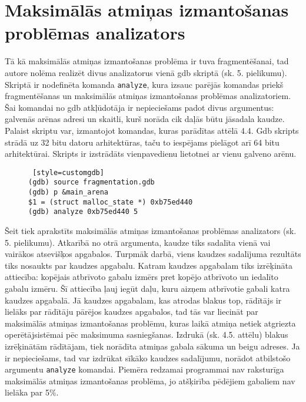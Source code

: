 \section{Maksimālās atmiņas izmantošanas problēmas analizators}
Tā kā maksimālās atmiņas izmantošanas problēma ir tuva fragmentēšanai, tad autore nolēma realizēt divus analizatorus vienā gdb skriptā (sk. 5. pielikumu).
Skriptā ir nodefinēta komanda \texttt{analyze}, kura izsauc parējās komandas priekš fragmentēšanas un maksimālās atmiņas izmantošanas problēmas analizatoriem.
Šai komandai no gdb atkļūdotāja ir nepieciešams padot divus argumentus: galvenās arēnas adresi un skaitli, kurš norāda cik daļās būtu jāsadala kaudze.
Palaist skriptu var, izmantojot komandas, kuras parādītas attēlā 4.4.
Gdb skripts strādā uz 32 bitu datoru arhitektūras, taču to iespējams pielāgot arī 64 bitu arhitektūrai.
Skripts ir izstrādāts vienpavedienu lietotnei ar vienu galveno arēnu.

\begin{figure}[h]
\begin{lstlisting} [style=customgdb]
(gdb) source fragmentation.gdb
(gdb) p &main_arena
$1 = (struct malloc_state *) 0xb75ed440
(gdb) analyze 0xb75ed440 5
\end{lstlisting}
\caption{\textbf{\fontsize{11}{12}\selectfont {Gdb skripta palaišana}}}
\end{figure} %


Šeit tiek aprakstīts maksimālās atmiņas izmantošanas problēmas analizators (sk. 5. pielikumu).
Atkarībā no otrā argumenta, kaudze tiks sadalīta vienā vai vairākos atsevišķos apgabalos.
Turpmāk darbā, viens kaudzes sadalījuma rezultāts tiks nosaukts par kaudzes apgabalu.
Katram kaudzes apgabalam tiks izrēķināta attiecība: kopējais atbrīvoto gabalu izmērs pret kopējo atbrīvoto un iedalīto gabalu izmēru.
Šī attiecība ļauj iegūt daļu, kuru aizņem atbrīvotie gabali katra kaudzes apgabalā.
Jā kaudzes apgabalam, kas atrodas blakus top, rādītājs ir lielāks par rādītāju pārējos kaudzes apgabalos, tad tās var liecināt par maksimālās atmiņas izmantošanas problēmu, kuras laikā atmiņa netiek atgriezta operētājsistēmai pēc maksimuma sasniegšanas.
Izdrukā (sk. 4.5. attēlu) blakus izrēķinātām rādītājam, tiek norādīta atmiņas gabala sākuma un beigu adreses.
Ja ir nepieciešams, tad var izdrūkat sīkāko kaudzes sadalījumu, norādot atbilstošo argumentu \texttt{analyze} komandai.
Piemēra redzamai programmai nav raksturīga maksimālās atmiņas izmantošanas problēma, jo atšķirība pēdējiem gabaliem nav lielāka par 5\%.

